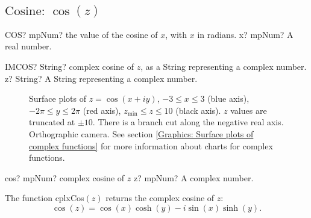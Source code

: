 \newpage
\subsection{\texorpdfstring{$\text{Cosine: }\cos(z)$}{cos}}

\begin{mpFunctionsExtract}
	\mpWorksheetFunctionOneNotImplemented
	{COS? mpNum? the value of the cosine of $x$, with $x$ in radians.}
	{x? mpNum? A real number.}
\end{mpFunctionsExtract}

\vspace{0.6cm}
\begin{mpFunctionsExtract}
	\mpWorksheetFunctionOneNotImplemented
	{IMCOS? String? complex cosine of $z$, as a String representing a complex number.}
	{z? String? A String representing a complex number.}
\end{mpFunctionsExtract}


\begin{figure}[ht]%
	\centering
	\qquad
	\caption[Complex Cosine]{Surface plots of $z = \cos(x + iy)$, $-3 \leq x \leq 3$ (blue axis), $-2 \pi \leq y \leq 2\pi$ (red axis), $z_{\text{min}} \leq z \leq 10$ (black axis). $z$ values are truncated at $\pm 10$. There is a branch cut along the negative real axis. Orthographic camera. See section \ref{Graphics: Surface plots of complex functions} for more information about charts for complex functions.} 
	\label{fig:Complex Cosine}%
\end{figure}


\begin{mpFunctionsExtract}
	\mpFunctionOne
	{cos? mpNum? complex cosine of $z$}
	{z? mpNum? A complex number.}
\end{mpFunctionsExtract}

\vspace{0.3cm}
The function \textsf{cplxCos$(z)$} returns the complex cosine of $z$: 
\begin{equation}
	\cos(z) = \cos(x) \cosh(y) - i \sin(x) \sinh(y).
\end{equation}


